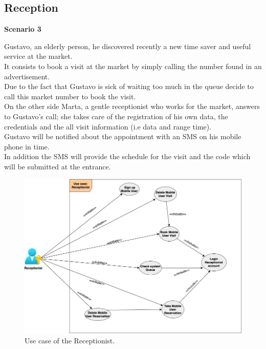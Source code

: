 \pagebreak

\subsection{Reception}
\par \medskip
{\normalsize \textbf{Scenario 3}}
\par \medskip
 Gustavo, an elderly person, he discovered recently a new time saver and useful service at the market. \\
 It consists to book a visit at the market by simply calling the number found in an advertisement. \\
 Due to the fact that Gustavo is sick of waiting too much in the queue decide to call this market number to book the visit. \\
 On the other side Marta, a gentle receptionist who works for the market, answers to Gustavo's call; she takes care of the registration of his own data, the credentials and the all visit information (i.e data and range time).\\
Gustavo will be notified about the appointment with an SMS on his mobile phone in time. \\
In addition the SMS will provide the schedule for the visit and the code which will be submitted at the entrance.
 
\bigbreak

 
 
 \begin{figure}[H]
 	\caption{Use case of the Receptionist.}
 	
 	\centering
 	\includegraphics[scale = 0.40]{diagrams/UseCaseReception.png}
 	
 \end{figure}

